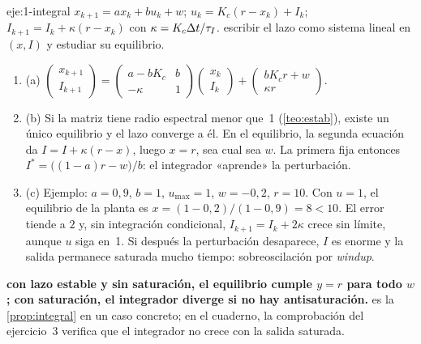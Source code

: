\begin{solucion}{eje:1-integral}
\datos $x_{k+1}=ax_k+bu_k+w$; $u_k=K_c(r-x_k)+I_k$; $I_{k+1}=I_k+\kappa(r-x_k)$ con $\kappa=K_c\Delta t/\tau_I$.
\planteamiento escribir el lazo como sistema lineal en $(x,I)$ y estudiar su equilibrio.
\pasos
\begin{enumerate}[label=\arabic*.]
  \item (a) $\begin{pmatrix}x_{k+1}\\I_{k+1}\end{pmatrix}=\begin{pmatrix}a-bK_c&b\\-\kappa&1\end{pmatrix}\begin{pmatrix}x_k\\I_k\end{pmatrix}+\begin{pmatrix}bK_cr+w\\\kappa r\end{pmatrix}$.
  \item (b) Si la matriz tiene radio espectral menor que~1 (\cref{teo:estab}), existe un único equilibrio y el lazo converge a él. En el equilibrio, la segunda ecuación da $I=I+\kappa(r-x)$, luego $x=r$, sea cual sea $w$. La primera fija entonces $I^{*}=\bigl((1-a)r-w\bigr)/b$: el integrador «aprende» la perturbación.
  \item (c) Ejemplo: $a=0{,}9$, $b=1$, $u_{\max}=1$, $w=-0{,}2$, $r=10$. Con $u=1$, el equilibrio de la planta es $x=(1-0{,}2)/(1-0{,}9)=8<10$. El error tiende a $2$ y, sin integración condicional, $I_{k+1}=I_k+2\kappa$ crece sin límite, aunque $u$ siga en~1. Si después la perturbación desaparece, $I$ es enorme y la salida permanece saturada mucho tiempo: sobreoscilación por \emph{windup}.
\end{enumerate}
\resultado \textbf{con lazo estable y sin saturación, el equilibrio cumple $y=r$ para todo $w$; con saturación, el integrador diverge si no hay antisaturación.}
\comprobacion es la \cref{prop:integral} en un caso concreto; en el cuaderno, la comprobación del ejercicio~3 verifica que el integrador no crece con la salida saturada.
\end{solucion}

